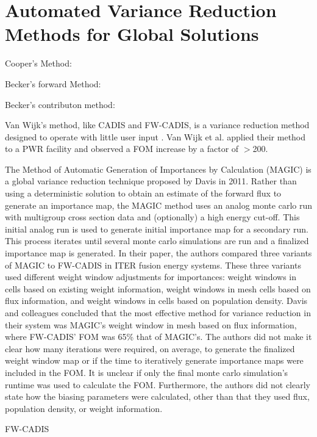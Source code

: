 \section{Automated Variance Reduction Methods for Global Solutions}
\label{sec:GlobalVR}

Cooper's Method: \cite{cooper_automated_2001}

Becker's forward Method: \cite{becker_hybrid_2007}

Becker's contributon method: \cite{becker_hybrid_2009}

Van Wijk's method, like CADIS and FW-CADIS, is a variance reduction method designed to operate with little user input \cite{van_wijk_easy_2011}. 
Van Wijk et al. applied their method to a PWR facility and observed a FOM increase by a factor of $>$200. 


The Method of Automatic Generation of Importances by Calculation (MAGIC) is a global variance reduction technique \cite{davis_comparison_2011} proposed by Davis in 2011. 
Rather than using a deterministic solution to obtain an estimate of the forward flux to generate an importance map, the MAGIC method uses an analog monte carlo run with multigroup cross section data and (optionally) a high energy cut-off.
This initial analog run is used to generate initial importance map for a secondary run.
This process iterates until several monte carlo simulations are run and a finalized importance map is generated. 
In their paper, the authors compared three variants of MAGIC to FW-CADIS in ITER fusion energy systems. 
These three variants used different weight window adjustments for importances: weight windows in cells based on existing weight information, weight windows in mesh cells based on flux information, and weight windows in cells based on population density. 
Davis and colleagues concluded that the most effective method for variance reduction in their system was MAGIC's weight window in mesh based on flux information, where FW-CADIS' FOM was 65\% that of MAGIC's. 
The authors did not make it clear how many iterations were required, on average, to generate the finalized weight window map or if the time to iteratively generate importance maps were included in the FOM. 
It is unclear if only the final monte carlo simulation's runtime was used to calculate the FOM. 
Furthermore, the authors did not clearly state how the biasing parameters were calculated, other than that they used flux, population density, or weight information. 


FW-CADIS \cite{wagner_forward-weighted_2007,wagner_forward-weighted_2009,wagner_forward-weighted_2010}

